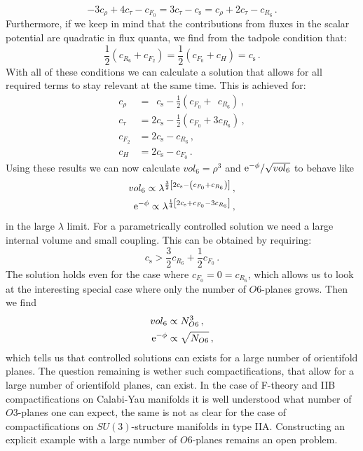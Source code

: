 \documentclass[12pt]{report}
\newcommand{\be}{\begin{equation}}
\newcommand{\ee}{\end{equation}}
\newcommand{\bea}{\begin{equation}\begin{aligned}}
\newcommand{\eea}{\end{aligned}\end{equation}}
\def\rme{{\rm e}}
\begin{document}
\be 
-3 c_\rho + 4 c_\tau -c_{F_0} = 3 c_\tau - c_{\text{s}} = c_\rho + 2 c_\tau -c_{R_6}\,.
\ee
Furthermore, if we keep in mind that the contributions from fluxes in the scalar potential are quadratic in flux quanta, we find from the tadpole condition that:
\be 
\frac{1}{2} \left( c_{R_6} + c_{F_2} \right) = \frac{1}{2} \left( c_{F_0} + c_H \right) = c_{\text{s}}\,.
\ee
With all of these conditions we can calculate a solution that allows for all required terms to stay relevant at the same time. This is achieved for:
\bea 
c_\rho &= \hspace{6pt} c_{\text{s}} - \frac{1}{2} \left( c_{F_0} + \;\, c_{R_6} \right)\,,\\
c_\tau &= 2 c_{\text{s}} - \frac{1}{2} \left(c_{F_0} + 3 c_{R_6} \right)\,,\\
c_{F_2} &= 2 c_{\text{s}} - c_{R_6}\,,\\
c_{H} &= 2 c_{\text{s}} - c_{F_0}\,.
\eea
Using these results we can now calculate $vol_6 = \rho^3$ and $\rme^ {-\phi}/\sqrt{vol_6}$ to behave like
\bea 
vol_6 \propto \lambda^ {\frac{3}{2} \left[ 2 c_{\text{s}} - \left(c_{F_0} + c_{R_6}\right)\right]}\,,\\
\rme^ {-\phi} \propto \lambda^ {\frac{1}{4} \left[2c_{\text{s}}+c_{F_0} -3 c_{R_6}\right]}\,,
\eea
in the large $\lambda$ limit. For a parametrically controlled solution we need a large internal volume and small coupling. This can be obtained by requiring:
\be 
c_{\text{s}} > \frac{3}{2} c_{R_6} + \frac{1}{2} c_{F_0}\,.
\ee
The solution holds even for the case where $c_{F_0} = 0 = c_{R_6}$, which allows us to look at the interesting special case where only the number of $O6$-planes grows. Then we find 
\bea
vol_6 &\propto N^ 3_{O6}\,,\\
\rme^ {-\phi} &\propto \sqrt{N_{O6}}\,,
\eea
which tells us that controlled solutions can exists for a large number of orientifold planes. The question remaining is wether such compactifications, that allow for a large number of orientifold planes, can exist. In the case of F-theory and IIB compactifications on Calabi-Yau manifolds it is well understood what number of $O3$-planes one can expect, the same is not as clear for the case of compactifications on $SU(3)$-structure manifolds in type IIA. Constructing an explicit example with a large number of $O6$-planes remains an open problem.
\end{document}
